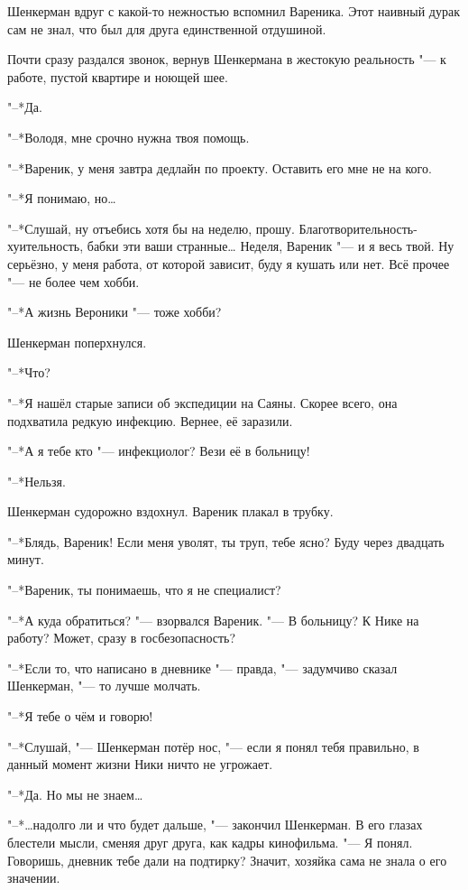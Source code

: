 Шенкерман вдруг с какой-то нежностью вспомнил Вареника.
Этот наивный дурак сам не знал, что был для друга единственной отдушиной.

Почти сразу раздался звонок, вернув Шенкермана в жестокую реальность "--- к работе, пустой квартире и ноющей шее.

"--*Да.

"--*Володя, мне срочно нужна твоя помощь.

"--*Вареник, у меня завтра дедлайн по проекту.
Оставить его мне не на кого.

"--*Я понимаю, но\dots{}

"--*Слушай, ну отъебись хотя бы на неделю, прошу.
Благотворительность-хуительность, бабки эти ваши странные\dots{}
Неделя, Вареник "--- и я весь твой.
Ну серьёзно, у меня работа, от которой зависит, буду я кушать или нет.
Всё прочее "--- не более чем хобби.

"--*А жизнь Вероники "--- тоже хобби?

Шенкерман поперхнулся.

"--*Что?

"--*Я нашёл старые записи об экспедиции на Саяны.
Скорее всего, она подхватила редкую инфекцию.
Вернее, её заразили.

"--*А я тебе кто "--- инфекциолог?
Вези её в больницу!

"--*Нельзя.

Шенкерман судорожно вздохнул.
Вареник плакал в трубку.

"--*Блядь, Вареник!
Если меня уволят, ты труп, тебе ясно?
Буду через двадцать минут.

\asterism

"--*Вареник, ты понимаешь, что я не специалист?

"--*А куда обратиться? "--- взорвался Вареник.
"--- В больницу?
К Нике на работу?
Может, сразу в госбезопасность?

"--*Если то, что написано в дневнике "--- правда, "--- задумчиво сказал Шенкерман, "--- то лучше молчать.

"--*Я тебе о чём и говорю!

"--*Слушай, "--- Шенкерман потёр нос, "--- если я понял тебя правильно, в данный момент жизни Ники ничто не угрожает.

"--*Да.
Но мы не знаем\dots{}

"--*\dots{}надолго ли и что будет дальше, "--- закончил Шенкерман.
В его глазах блестели мысли, сменяя друг друга, как кадры кинофильма.
"--- Я понял.
Говоришь, дневник тебе дали на подтирку?
Значит, хозяйка сама не знала о его значении.

